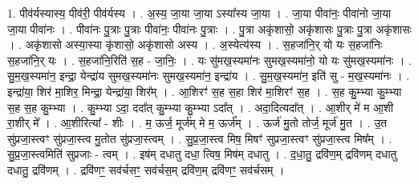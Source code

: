 \documentclass[17pt]{extarticle}
\begin{document}
1. पीव॑र्यस्यास्य॒ पीव॑री॒ पीव॑र्यस्य । . अ॒स्य॒ जा॒या जा॒या ऽस्या᳚स्य जा॒या । . जा॒या पीवा॑नः॒ पीवा॑नो जा॒या जा॒या पीवा॑नः । . पीवा॑नः पु॒त्राः पु॒त्राः पीवा॑नः॒ पीवा॑नः पु॒त्राः । . पु॒त्रा अकृ॑शासो॒ अकृ॑शासः पु॒त्राः पु॒त्रा अकृ॑शासः । . अकृ॑शासो अस्या॒स्या कृ॑शासो॒ अकृ॑शासो अस्य । . अ॒स्येत्य॑स्य । . स॒हजा॑नि॒र् यो यः स॒हजा॑निः स॒हजा॑नि॒र् यः । . स॒हजा॑नि॒रिति॑ स॒ह - जा॒निः॒ । . यः सु॑मख॒स्यमा॑नः सुमख॒स्यमा॑नो॒ यो यः सु॑मख॒स्यमा॑नः । . सु॒म॒ख॒स्यमा॑न॒ इन्द्रा॒ येन्द्रा॑य सुमख॒स्यमा॑नः सुमख॒स्यमा॑न॒ इन्द्रा॑य । . सु॒म॒ख॒स्यमा॑न॒ इति॑ सु - म॒ख॒स्यमा॑नः । . इन्द्रा॑या॒ शिर॑ मा॒शिर॒ मिन्द्रा॒ येन्द्रा॑या॒ शिर᳚म् । . आ॒शिरꣳ॑ स॒ह स॒हा शिर॑ मा॒शिरꣳ॑ स॒ह । . स॒ह कु॒म्भ्या कु॒म्भ्या स॒ह स॒ह कु॒म्भ्या । . कु॒म्भ्या ऽदा॒ ददा᳚त् कु॒म्भ्या कु॒म्भ्या ऽदा᳚त् । . अदा॒दित्यदा᳚त् । . आ॒शीर् मे॑ म आ॒शी रा॒शीर् मे᳚ । . आ॒शीरित्या᳚ - शीः । . म॒ ऊर्ज॒ मूर्ज॑म् मे म॒ ऊर्ज᳚म् । . ऊर्ज॑ मु॒तो तोर्ज॒ मूर्ज॑ मु॒त । . उ॒त सु॑प्रजा॒स्त्वꣳ सु॑प्रजा॒स्त्व मु॒तोत सु॑प्रजा॒स्त्वम् । . सु॒प्र॒जा॒स्त्व मिष॒ मिषꣳ॑ सुप्रजा॒स्त्वꣳ सु॑प्रजा॒स्त्व मिष᳚म् । . सु॒प्र॒जा॒स्त्वमिति॑ सुप्रजाः - त्वम् । . इष॑म् दधातु दधा॒ त्विष॒ मिष॑म् दधातु । . द॒धा॒तु॒ द्रवि॑ण॒म् द्रवि॑णम् दधातु दधातु॒ द्रवि॑णम् । . द्रवि॑णꣳ॒॒ सव॑र्चसꣳ॒॒ सव॑र्चस॒म् द्रवि॑ण॒म् द्रवि॑णꣳ॒॒ सव॑र्चसम् । \newline
\end{document}
